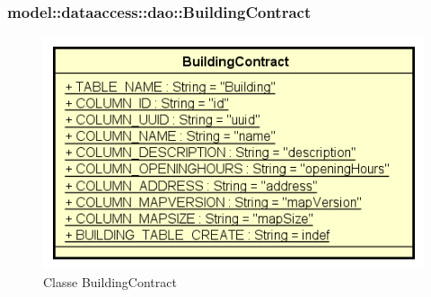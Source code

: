 \documentclass[../DefinizioneDiProdotto.tex]{subfiles}
\begin{document}
\subsubsection{model::dataaccess::dao::BuildingContract}

    \begin{figure}[H]
        \centering
        \includegraphics{img/BuildingContract.png}
        \caption{Classe BuildingContract}\label{fig:model::dataaccess::dao::BuildingContract} 
    \end{figure}
\end{document}
